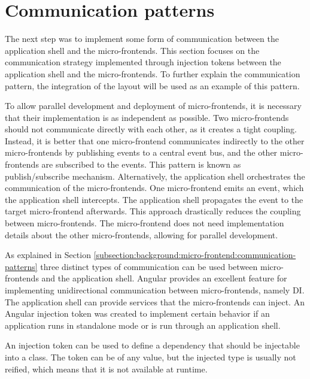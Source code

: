 \section{Communication patterns}\label{section:applied-methods:communication-shell-remote}

The next step was to implement some form of communication between the application shell and the micro-frontends. This section focuses on the communication strategy implemented through injection tokens between the application shell and the micro-frontends. To further explain the communication pattern, the integration of the layout will be used as an example of this pattern.

\bigskip

\noindent To allow parallel development and deployment of micro-frontends, it is necessary that their implementation is as independent as possible. Two micro-frontends should not communicate directly with each other, as it creates a tight coupling. Instead, it is better that one micro-frontend communicates indirectly to the other micro-frontends by publishing events to a central event bus, and the other micro-frontends are subscribed to the events. This pattern is known as publish/subscribe mechanism. Alternatively, the application shell orchestrates the communication of the micro-frontends. One micro-frontend emits an event, which the application shell intercepts. The application shell propagates the event to the target micro-frontend afterwards. This approach drastically reduces the coupling between micro-frontends. The micro-frontend does not need implementation details about the other micro-frontends, allowing for parallel development.

\bigskip

\noindent As explained in Section \ref{subsection:background:micro-frontend:communication-patterns} three distinct types of communication can be used between micro-frontends and the application shell. Angular provides an excellent feature for implementing unidirectional communication between micro-frontends, namely \ac{DI}. The application shell can provide services that the micro-frontends can inject. An Angular injection token was created to implement certain behavior if an application runs in standalone mode or is run through an application shell.

\noindent An injection token can be used to define a dependency that should be injectable into a class. The token can be of any value, but the injected type is usually not reified, which means that it is not available at runtime. \cite{misc:-:applied-methods:communication:angular-injection-token}


